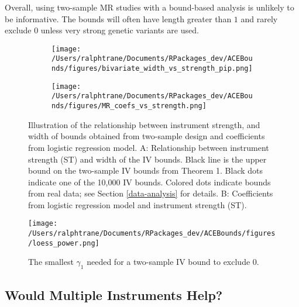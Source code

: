 \documentclass[
]{article}
\theoremstyle{plain}
\begin{document}
Overall, using two-sample MR studies with a bound-based analysis is unlikely to be informative. The bounds will often have length greater than \(1\) and rarely exclude \(0\) unless very strong genetic variants are used.

\begin{figure*}
  \centering
  \begin{subfigure}[t]{0.48\textwidth}
    \centering
    \caption{}
    \label{fig:biv_bounds_vs_strength}
    \texttt{[image: /Users/ralphtrane/Documents/RPackages\_dev/ACEBounds/figures/bivariate\_width\_vs\_strength\_pip.png]}
  \end{subfigure}%
  \hspace{0.15in}
  \begin{subfigure}[t]{0.48\textwidth}
    \centering
    \caption{}
    \label{fig:biv_width_vs_strength}
    \texttt{[image: /Users/ralphtrane/Documents/RPackages\_dev/ACEBounds/figures/MR\_coefs\_vs\_strength.png]}
  \end{subfigure}
  \caption{Illustration of the relationship between instrument strength, and width of bounds obtained from two-sample design and coefficients from logistic regression model. A: Relationship between instrument strength (ST) and width of the IV bounds. Black line is the upper bound on the two-sample IV bounds from Theorem 1. Black dots indicate one of the 10,000 IV bounds. Colored dots indicate bounds from real data; see Section \ref{data-analysis} for details. B: Coefficients from logistic regression model and instrument strength (ST).}
  \label{fig:coef_vs_strength}
\end{figure*}

\begin{figure}[H]
  \centering
  \texttt{[image: /Users/ralphtrane/Documents/RPackages\_dev/ACEBounds/figures/loess\_power.png]}
  \caption{The smallest $\gamma_1$ needed for a two-sample IV bound to exclude $0$.}
  \label{fig:power_curves}
\end{figure}

\hypertarget{would-multiple-instruments-help}{%
\subsection{Would Multiple Instruments Help?}\label{would-multiple-instruments-help}}
\end{document}
